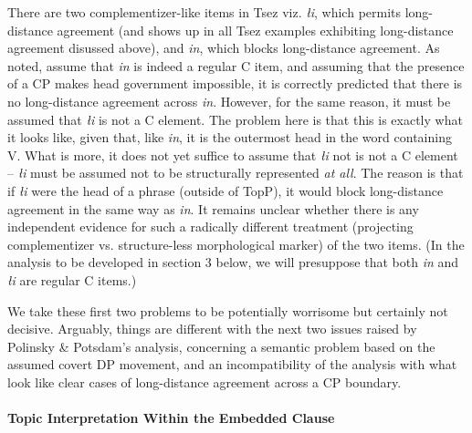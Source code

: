 \documentclass[output=paper
,modfonts
,nonflat]{langsci/langscibook}
\begin{document}
There are two comp\-lement\-izer-like items in Tsez viz. {\it {\l}i},
which permits long-distance agreement (and shows up in all Tsez
examples exhibiting long-distance agreement disussed above), and {\it
  \textcrlambda in}, which blocks long-distance agreement. As noted,
\cite{Polinsky&Potsdam:01} assume that {\it \textcrlambda in} is
indeed a regular C item, and assuming that the presence of a CP makes
head government impossible, it is correctly predicted that there is no
long-distance agreement across {\it \textcrlambda in}.
However,  for the same reason, it must be assumed that {\it {\l}i} is
not a C element. The problem here is that this is exactly what
it looks like, given that, like {\it \textcrlambda in}, it is the
outermost head in the word containing V. What is more, it does not yet suffice to
assume that  {\it {\l}i} not is not a C element -- {\it {\l}i} must  be
assumed not to be structurally represented {\it at all}. The reason is
that if {\it {\l}i} were the head of a phrase (outside of TopP), it would block
long-distance agreement in the same way as {\it \textcrlambda in}. 
It remains unclear whether there is any independent evidence for such
a radically different treatment (projecting complementizer
vs. structure-less morphological marker) of the two items. (In the
analysis to be developed in section 3 below, we will presuppose that
both  {\it \textcrlambda in} and {\it {\l}i} are regular C items.)

We take these first two problems to be potentially worrisome but
certainly not decisive. Arguably, things are different with the next
two issues raised by Polinsky \& Potsdam's analysis, concerning a
semantic problem based on the assumed covert DP movement, and an
incompatibility of the analysis with what look like clear cases of
long-distance agreement across a CP boundary.


\paragraph{Topic Interpretation Within the Embedded Clause}
\end{document}
